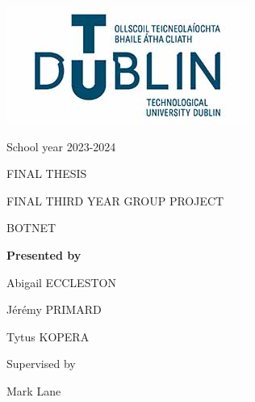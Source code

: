 \documentclass[../main.tex]{subfiles}
\begin{document}
\makeatletter
\begin{titlepage}
    
	\normalfont

	\begin{center}

		\uppercase{
			\fontsize{12}{12} 
			\selectfont
			\bf
            \@title
		}

		\includegraphics[height=0.25\textwidth]{tu_dublin_logo.jpg}

	\end{center}

	{
		\fontsize{10}{10} 
		\selectfont
		\bf


		School year 2023-2024

		FINAL THESIS

	}


	\horizline{0.5pt}

	\vfill

	\begin{center}
		\fontsize{14}{18} 
		\selectfont
		\bf

		FINAL THIRD YEAR GROUP PROJECT

		\vfill

		BOTNET

	
	\end{center}


	\horizline{0.5pt}


	\begin{center}
		\bf
		\fontsize{12}{12} 
		\selectfont
		Presented by

		\vfill

		\fontsize{14}{18} 
		\selectfont

        Abigail ECCLESTON

        Jérémy PRIMARD
        
        Tytus KOPERA

		\vfill

		\fontsize{12}{12} 
		\selectfont

		Supervised by

		\fontsize{14}{18} 
		\selectfont

		Mark Lane

	\end{center}


\end{titlepage}
\end{document}

